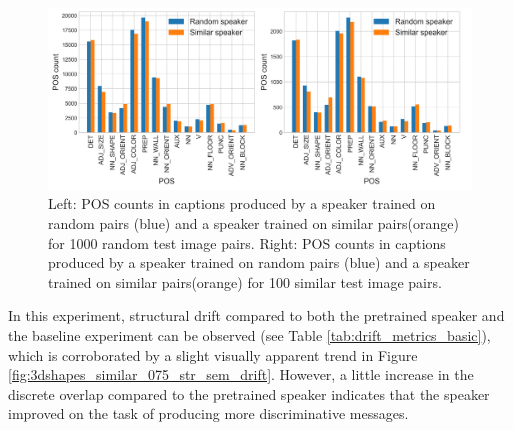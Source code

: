 \begin{figure}[h]
	\centering
	\includegraphics[width=\linewidth]{images/3dshapes_random_vs_similar_POS_counts.png}
	\caption{Left: POS counts in captions produced by a speaker trained on random pairs (blue) and a speaker trained on similar pairs(orange) for 1000 random test image pairs. Right: POS counts in captions produced by a speaker trained on random pairs (blue) and a speaker trained on similar pairs(orange) for 100 similar test image pairs. }
	\label{fig:3dshapes_pos}
\end{figure}

In this experiment, structural drift compared to both the pretrained speaker and the baseline experiment can be observed (see Table \ref{tab:drift_metrics_basic}), which is corroborated by a slight visually apparent trend in Figure \ref{fig:3dshapes_similar_075_str_sem_drift}. However, a little increase in the discrete overlap compared to the pretrained speaker indicates that the speaker improved on the task of producing more discriminative messages.

